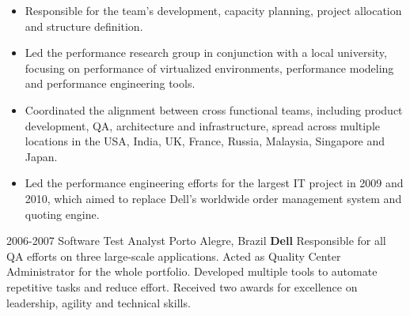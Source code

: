 \begin{entrylist}
{\begin{itemize}
        \item Responsible for the team's development, capacity planning, project allocation and structure definition.
        \item Led the performance research group in conjunction with a local university, focusing on performance of virtualized environments, performance modeling and performance engineering tools.
        \item Coordinated the alignment between cross functional teams, including product development, QA, architecture and infrastructure, spread across multiple locations in the USA, India, UK, France, Russia, Malaysia, Singapore and Japan.
        \item Led the performance engineering efforts for the largest IT project in 2009 and 2010, which aimed to replace Dell's worldwide order management system and quoting engine.
      \end{itemize}
    }
  \entry
    {2006-2007}
    {Software Test Analyst}
    {Porto Alegre, Brazil}
    {
      \textbf{Dell}
      \newline
      Responsible for all QA efforts on three large-scale applications. Acted as Quality Center Administrator for the whole portfolio. Developed multiple tools to automate repetitive tasks and reduce effort. Received two awards for excellence on leadership, agility and technical skills.
}
\end{entrylist}
